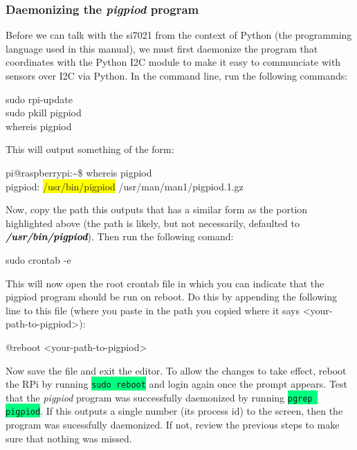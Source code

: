 \documentclass{article}
\newcommand*{\myfont}{\fontfamily{pcr}\selectfont}
\newcommand{\codei}[1]{\colorbox{SpringGreen}{\texttt{#1}}} %
\newcommand{\codeb}[2]{
  \begin{tcolorbox}[width=\textwidth,colback={SpringGreen},title={#1},colbacktitle=darkgreen,coltitle=SpringGreen]
    \myfont
    #2
  \end{tcolorbox}
} %
\newcommand{\outputb}[2]{
  \begin{tcolorbox}[width=\textwidth,colback={light-gray},title={#1},colbacktitle=gray,coltitle=light-gray]
    \myfont
    #2
  \end{tcolorbox}
} %
\newcommand{\loc}[1]{\textit{\textcolor{Black}{\textbf{#1}}}} %
\begin{document}
  \subsubsection{Daemonizing the \textit{pigpiod} program}
    Before we can talk with the si7021 from the context of Python (the programming language used in this manual), we must first daemonize the program that coordinates with the Python I2C module to make it easy to communciate with sensors over I2C via Python. In the command line, run the following commands:
    \codeb{Prep the environment and locate \textit{pigpiod}}
    {
      sudo rpi-update     \\
      sudo pkill pigpiod  \\
      whereis pigpiod
    }
    This will output something of the form:
    \outputb{\texttt{whereis pigpiod} command output}
    {
      pi@raspberrypi:\textasciitilde \$ whereis pigpiod \\
      pigpiod: \colorbox{Yellow}{/usr/bin/pigpiod} /usr/man/man1/pigpiod.1.gz
    }
    Now, copy the path this outputs that has a similar form as the portion highlighted above (the path is likely, but not necessarily, defaulted to \loc{/usr/bin/pigpiod}). Then run the following comand:
    \codeb{Open the root crontab}
    {
      sudo crontab -e
    }
    This will now open the root crontab file in which you can indicate that the pigpiod program should be run on reboot. Do this by appending the following line to this file (where you paste in the path you copied where it says <your-path-to-pigpiod>):
    \outputb{Daemonize \textit{pigpiod} command}
    {
      @reboot              <your-path-to-pigpiod>
    }
    Now save the file and exit the editor. To allow the changes to take effect, reboot the RPi by running \codei{sudo reboot} and login again once the prompt appears. Test that the \textit{pigpiod} program was successfully daemonized by running \codei{pgrep pigpiod}. If this outputs a single number (its process id) to the screen, then the program was sucessfully daemonized. If not, review the previous steps to make sure that nothing was missed.
\end{document}
